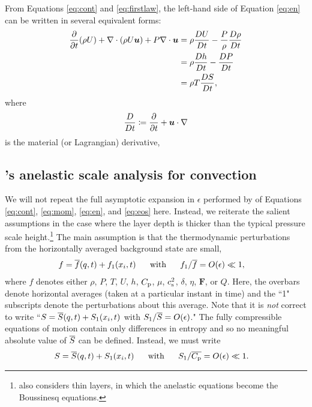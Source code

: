 \documentclass[12pt]{article}
\newcommand{\vecf}{\bm{F}}
\begin{document}
	From Equations \eqref{eq:cont} and \eqref{eq:firstlaw}, the left-hand side of Equation \eqref{eq:en} can be written in several equivalent forms:
	\begin{subequations}\label{eq:enlhs}
		\begin{align}
			\frac{\partial}{\partial t}(\rho U) + \nabla\cdot(\rho U\bm{u}) + P\nabla\cdot\bm{u} &= \rho\frac{DU}{Dt} - \frac{P}{\rho}\frac{D\rho}{Dt}\\
			&= \rho\frac{Dh}{Dt} -\frac{DP}{Dt}\\
			&=\rho T \frac{DS}{Dt},
		\end{align}
	\end{subequations}
	where 
	\begin{align}\label{eq:matderiv}
		\frac{D}{Dt}{}\coloneqq \frac{\partial}{\partial t} + \bm{u}\cdot\nabla
	\end{align}
	is the material (or Lagrangian) derivative,
	
	\subsection{\citet{Gough1969}'s anelastic scale analysis for convection}
	We will not repeat the full asymptotic expansion in $\epsilon$ performed by \citet{Gough1969} of Equations \eqref{eq:cont}, \eqref{eq:mom}, \eqref{eq:en}, and \eqref{eq:eos} here. Instead, we reiterate the salient assumptions in the case where the layer depth is thicker than the typical pressure scale height.\footnote{\citet{Gough1969} also considers thin layers, in which the anelastic equations become the Boussinesq equations.} The main assumption is that the thermodynamic perturbations from the horizontally averaged background state are small,
	\begin{align}\label{eq:smallthermalpert}
		f = \overline{f}(q,t) + f_1(x_i,t)\ \ \ \ \  &\text{with}\ \ \ \ \  f_1/\overline{f}=O(\epsilon)\ll 1,
	\end{align} 
	where $f$ denotes either $\rho$, $P$, $T$, $U$, $h$, $C_{\rm{p}}$, $\mu$, $c_{\rm s}^2$, $\delta$, $\eta$, $\vecf$, or $Q$. Here, the overbars denote horizontal averages (taken at a particular instant in time) and the ``1" subscripts denote the perturbations about this average. Note that it is \textit{not} correct to write ``$S=\overline{S}(q,t)+S_1(x_i,t)$ with $S_1/\overline{S}=O(\epsilon)$." The fully compressible equations of motion contain only differences in entropy and so no meaningful absolute value of $\overline{S}$ can be defined. Instead, we must write
	\begin{align}\label{eq:linearent}
	S = \overline{S}(q,t) + S_1(x_i,t) \ \ \ \ \  &\text{with}\ \ \ \ \  S_1/\overline{C_{\rm{p}}}=O(\epsilon)\ll 1.
	\end{align}
	
\end{document}
